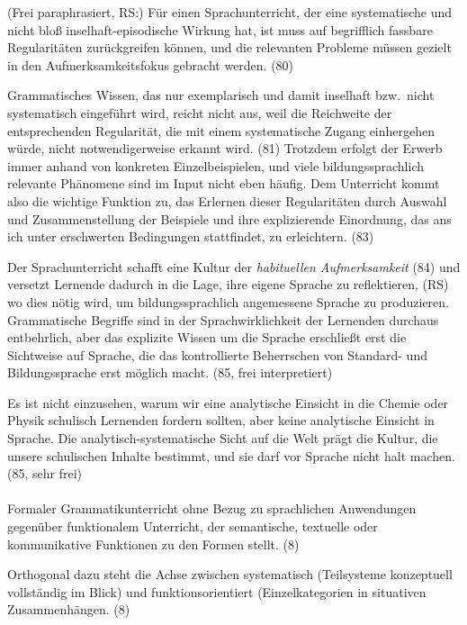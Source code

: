 (Frei paraphrasiert, RS:) Für einen Sprachunterricht, der eine systematische und nicht bloß inselhaft-episodische Wirkung hat, ist muss auf begrifflich fassbare Regularitäten zurückgreifen können, und die relevanten Probleme müssen gezielt in den Aufmerksamkeitsfokus gebracht werden. (80)

Grammatisches Wissen, das nur exemplarisch und damit inselhaft bzw.\ nicht systematisch eingeführt wird, reicht nicht aus, weil die Reichweite der entsprechenden Regularität, die mit einem systematische Zugang einhergehen würde, nicht notwendigerweise erkannt wird. (81)
Trotzdem erfolgt der Erwerb immer anhand von konkreten Einzelbeispielen, und viele bildungssprachlich relevante Phänomene sind im Input nicht eben häufig.
Dem Unterricht kommt also die wichtige Funktion zu, das Erlernen dieser Regularitäten durch Auswahl und Zusammenstellung der Beispiele und ihre explizierende Einordnung, das ans ich unter erschwerten Bedingungen stattfindet, zu erleichtern. (83)

Der Sprachunterricht schafft eine Kultur der \textit{habituellen Aufmerksamkeit} (84) und versetzt Lernende dadurch in die Lage, ihre eigene Sprache zu reflektieren, (RS) wo dies nötig wird, um bildungssprachlich angemessene Sprache zu produzieren.
Grammatische Begriffe sind in der Sprachwirklichkeit der Lernenden durchaus entbehrlich, aber das explizite Wissen um die Sprache erschließt erst die Sichtweise auf Sprache, die das kontrollierte Beherrschen von Standard- und Bildungssprache erst möglich macht. (85, frei interpretiert)

Es ist nicht einzusehen, warum wir eine analytische Einsicht in die Chemie oder Physik schulisch Lernenden fordern sollten, aber keine analytische Einsicht in Sprache.
Die analytisch-systematische Sicht auf die Welt prägt die Kultur, die unsere schulischen Inhalte bestimmt, und sie darf vor Sprache nicht halt machen. (85, sehr frei)


\paragraph{\citet{Menzel2017}}

Formaler Grammatikunterricht ohne Bezug zu sprachlichen Anwendungen gegenüber funktionalem Unterricht, der semantische, textuelle oder kommunikative Funktionen zu den Formen stellt. (8)

Orthogonal dazu steht die Achse zwischen systematisch (Teilsysteme konzeptuell vollständig im Blick) und funktionsorientiert (Einzelkategorien in situativen Zusammenhängen. (8)

